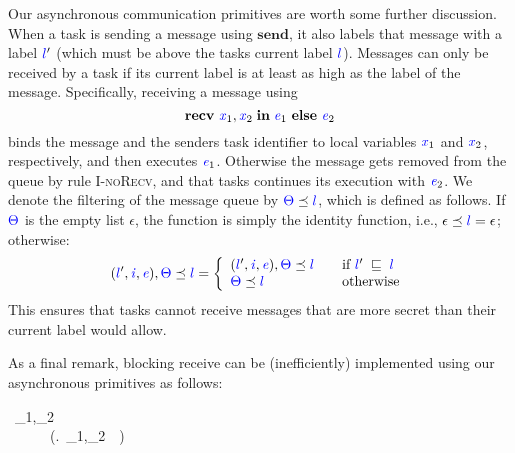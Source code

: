 \documentclass{sigplanconf}
\newcommand{\Varid}[1]{\mathit{#1}}
\def\resethooks{%
  \global\let\SaveRestoreHook\empty
  \global\let\ColumnHook\empty}
\let\hspre\empty
\let\hspost\empty
\begin{document}
Our asynchronous communication primitives are worth some further
discussion.  When a task is sending a message using \ensuremath{\mathbf{send}}, it also labels that
message with a label \ensuremath{\ifc{l}'} (which must be above the tasks current label \ensuremath{\ifc{l}}).
Messages can only be received by a task if its current label is
at least as high as the label of the message.
Specifically, receiving a message using
\[ \ensuremath{\mathbf{recv}\ \ifc{\Varid{x}}_{1},\ifc{\Varid{x}}_{2}\;\mathbf{in}\;\ifc{\Varid{e}}_{1}\ \mathbf{else}\ \ifc{\Varid{e}}_{2}} \]
binds the message and the senders task identifier
to local variables \ensuremath{\ifc{\Varid{x}}_{1}} and \ensuremath{\ifc{\Varid{x}}_{2}}, respectively, and then executes \ensuremath{\ifc{\Varid{e}}_{1}}.
Otherwise the message gets removed from the queue by rule \textsc{I-noRecv},
and that tasks continues its execution with \ensuremath{\ifc{\Varid{e}}_{2}}.
We denote the filtering of the message queue by \ensuremath{\ifc{\Theta}\preceq\ifc{l}},
which is defined as follows.
If \ensuremath{\ifc{\Theta}} is the empty list \ensuremath{\epsilon}, the
function is simply the identity function, i.e.,
\ensuremath{\epsilon\preceq\ifc{l}\mathrel{=}\epsilon}; otherwise:
\[
\ensuremath{(\ifc{l}',\ifc{\Varid{i}},\ifc{\Varid{e}}),\ifc{\Theta}\preceq\ifc{l}} = \left\{
\begin{array}{l l}
\ensuremath{(\ifc{l}',\ifc{\Varid{i}},\ifc{\Varid{e}}),\ifc{\Theta}\preceq\ifc{l}} & \quad \text{if \ensuremath{\ifc{l}'\;\flows{}\;\ifc{l}}}\\
\ensuremath{\ifc{\Theta}\preceq\ifc{l}} & \quad \text{otherwise}
\end{array} \right.
\]
This ensures that tasks cannot receive messages that are more secret
than their current label would allow.

As a final remark, blocking receive can be (inefficiently) implemented using
our asynchronous primitives as follows:
\begin{hscode}\SaveRestoreHook
\column{B}{@{}>{\hspre}l<{\hspost}@{}}%
\column{3}{@{}>{\hspre}l<{\hspost}@{}}%
\column{E}{@{}>{\hspre}l<{\hspost}@{}}%
\>[3]{}\ \ifc{\Varid{x}}_{1},\ifc{\Varid{x}}_{2}\;\;\ifc{\Varid{e}}\triangleq{}{}\<[E]%
\\
\>[3]{}\ \ \;\ \ \;\ \ \;\;(\lambda \Varid{k}.\ \ifc{\Varid{x}}_{1},\ifc{\Varid{x}}_{2}\;\;\ifc{\Varid{e}}\ \ \Varid{k}\ifc{\rceil}\tar{\rfloor})\ifc{\rceil}{}\<[E]%
\ColumnHook
\end{hscode}\resethooks
\end{document}
